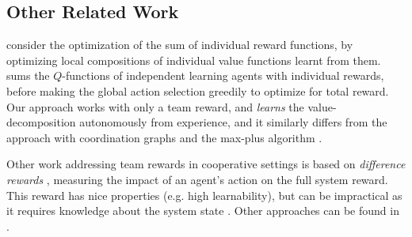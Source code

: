 \documentclass{article}
\begin{document}

\subsection{Other Related Work}

\citet{SchneiderDistributed} consider the optimization of the sum of individual reward functions, by optimizing local compositions of individual value functions learnt from them. \citet{RussellZimdarsQDecomposition} sums the $Q$-functions of independent learning agents with individual rewards, before making the global action selection greedily to optimize for total reward. Our approach works with only a team reward, and \emph{learns} the value-decomposition autonomously from experience, and it similarly differs from the approach with coordination graphs \citep{Guestrin2002} and the max-plus algorithm \citep{KuyerWBV08,Pol16}.


Other work addressing team rewards in cooperative  settings is based on \textit{difference rewards} \citep{tumer-wolpert_cdcs04}, measuring the impact of an agent's action on the full system reward. This reward has nice properties (e.g. high learnability), but can be impractical as it requires knowledge about the system state \citep{tumer-colby_aamas16,tumer-agogino_jaamas08,tumer-proper_aamas12}. Other approaches can be found in \citet{tumer-devlin_aamas14,tumer-holmesparker_ker14,BabesCL08}.

\end{document}
